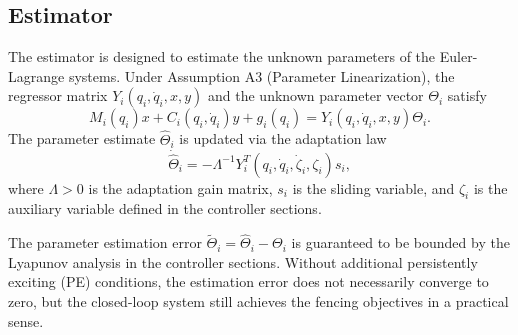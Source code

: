 \subsection{Estimator}

The estimator is designed to estimate the unknown parameters of the Euler-Lagrange systems.
Under Assumption A3 (Parameter Linearization), the regressor matrix $Y_i(q_i,\dot{q}_i,x,y)$ and the unknown parameter vector $\Theta_i$ satisfy
\begin{equation}
    M_i(q_i)x + C_i(q_i,\dot{q}_i)y + g_i(q_i) = Y_i(q_i,\dot{q}_i,x,y)\Theta_i.
\end{equation}
The parameter estimate $\hat{\Theta}_i$ is updated via the adaptation law
\begin{equation}
    \dot{\hat{\Theta}}_i = -\Lambda^{-1} Y_i^T(q_i,\dot{q}_i,\dot{\zeta}_i,\zeta_i) s_i,
\end{equation}
where $\Lambda > 0$ is the adaptation gain matrix, $s_i$ is the sliding variable, and $\zeta_i$ is the auxiliary variable defined in the controller sections.

The parameter estimation error $\tilde{\Theta}_i = \hat{\Theta}_i - \Theta_i$ is guaranteed to be bounded by the Lyapunov analysis in the controller sections. Without additional persistently exciting (PE) conditions, the estimation error does not necessarily converge to zero, but the closed-loop system still achieves the fencing objectives in a practical sense.